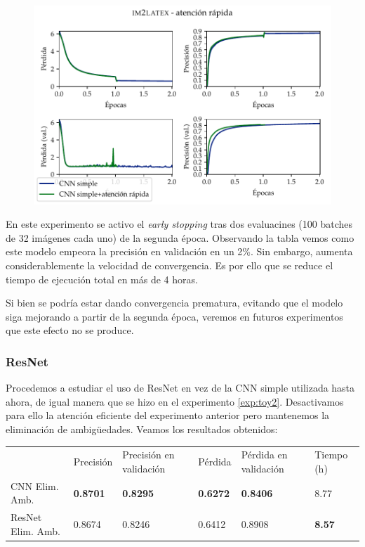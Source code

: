 \documentclass[a4paper, 20pt, dvipsnames]{article}
\begin{document}
\begin{figure}[H]
	\centering
	\includegraphics{fig/im2latex-3a.pdf}
\end{figure}

En este experimento se activo el \emph{early stopping} tras dos evaluacines (100
batches de 32 imágenes cada uno) de la segunda época. Observando la tabla vemos
como este modelo empeora la precisión en validación en un 2\%. Sin embargo,
aumenta considerablemente la velocidad de convergencia. Es por ello que se
reduce el tiempo de ejecución total en más de 4 horas.

Si bien se podría estar dando convergencia prematura, evitando que el modelo
siga mejorando a partir de la segunda época, veremos en futuros experimentos que
este efecto no se produce.

\subsubsection{ResNet}
\label{exp:3b}

Procedemos a estudiar el uso de ResNet en vez de la CNN simple utilizada hasta
ahora, de igual manera que se hizo en el experimento
\ref{exp:toy2}. Desactivamos para ello la atención eficiente del experimento
anterior pero mantenemos la eliminación de ambigüedades. Veamos los resultados
obtenidos:

\begin{table}[H]
	\centering
	\begin{tabular}{llllll}
		& Precisión       & Precisión en validación & Pérdida         & Pérdida en validación & Tiempo (h)    \\ \cline{2-6} 
		CNN Elim. Amb.    & \textbf{0.8701} & \textbf{0.8295}         & \textbf{0.6272} & \textbf{0.8406}       & 8.77          \\
		ResNet Elim. Amb. & 0.8674          & 0.8246                  & 0.6412          & 0.8908                & \textbf{8.57}
	\end{tabular}
\end{table}
\end{document}
